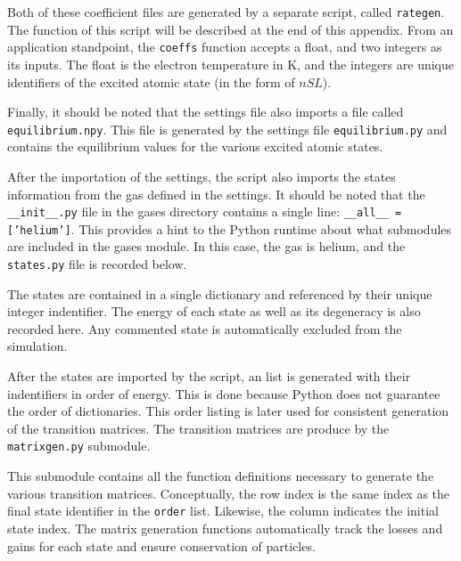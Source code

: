 Both of these coefficient files are generated by a separate script, called
\texttt{rategen}. The function of this script will be described at the end of
this appendix. From an application standpoint, the \texttt{coeffs} function
accepts a float, and two integers as its inputs. The float is the electron
temperature in K, and the integers are unique identifiers of the excited atomic
state (in the form of $nSL$).

Finally, it should be noted that the settings file also imports a file called
\texttt{equilibrium.npy}. This file is generated by the settings file
\texttt{equilibrium.py} and contains the equilibrium values for the various
excited atomic states.

After the importation of the settings, the script also imports the states
information from the gas defined in the settings. It should be noted that the
\texttt{\_\_init\_\_.py} file in the gases directory contains a single line:
\texttt{\_\_all\_\_ = ['helium']}. This provides a hint to the Python runtime
about what submodules are included in the gases module. In this case, the gas is
helium, and the \texttt{states.py} file is recorded below.
\begin{singlespace}
  
\end{singlespace}
The states are contained in a single dictionary and referenced by their unique
integer indentifier. The energy of each state as well as its degeneracy is also
recorded here. Any commented state is automatically excluded from the
simulation.

After the states are imported by the script, an list is generated with their
indentifiers in order of energy. This is done because Python does not guarantee
the order of dictionaries. This order listing is later used for consistent
generation of the transition matrices. The transition matrices are produce by
the \texttt{matrixgen.py} submodule.
\begin{singlespace}
  
\end{singlespace}
This submodule contains all the function definitions necessary to generate the
various transition matrices. Conceptually, the row index is the same index as
the final state identifier in the \texttt{order} list. Likewise, the column
indicates the initial state index. The matrix generation functions automatically
track the losses and gains for each state and ensure conservation of particles.

